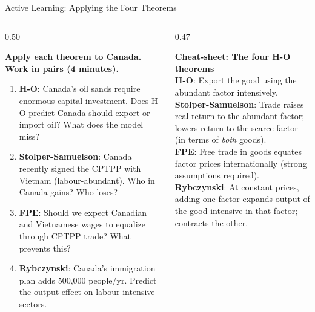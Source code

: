 \documentclass[aspectratio=169]{beamer}
\begin{document}
\begin{frame}[shrink=15]{Active Learning: Applying the Four Theorems}
\begin{columns}[T]
\begin{column}{0.50\textwidth}
\begin{discuss}
\small\textbf{Apply each theorem to Canada.
Work in pairs (4 minutes).}\\[0.4em]
\begin{enumerate}
  \item \textbf{H-O}: Canada's oil sands require
        enormous capital investment. Does H-O
        predict Canada should export or import
        oil? What does the model miss?
  \item \textbf{Stolper-Samuelson}: Canada recently
        signed the CPTPP with Vietnam (labour-abundant).
        Who in Canada gains? Who loses?
  \item \textbf{FPE}: Should we expect Canadian
        and Vietnamese wages to equalize through
        CPTPP trade? What prevents this?
  \item \textbf{Rybczynski}: Canada's immigration
        plan adds 500,000 people/yr. Predict the
        output effect on labour-intensive sectors.
\end{enumerate}
\end{discuss}
\end{column}
\begin{column}{0.47\textwidth}
\begin{varbox}
\small\textbf{Cheat-sheet: The four H-O theorems}\\[0.4em]
\textbf{H-O}: Export the good using the abundant
factor intensively.\\[0.3em]
\textbf{Stolper-Samuelson}: Trade raises real
return to the abundant factor; lowers return
to the scarce factor (in terms of \emph{both}
goods).\\[0.3em]
\textbf{FPE}: Free trade in goods equates
factor prices internationally
(strong assumptions required).\\[0.3em]
\textbf{Rybczynski}: At constant prices, adding
one factor expands output of the good intensive
in that factor; contracts the other.
\end{varbox}
\end{column}
\end{columns}
\end{frame}
\end{document}
